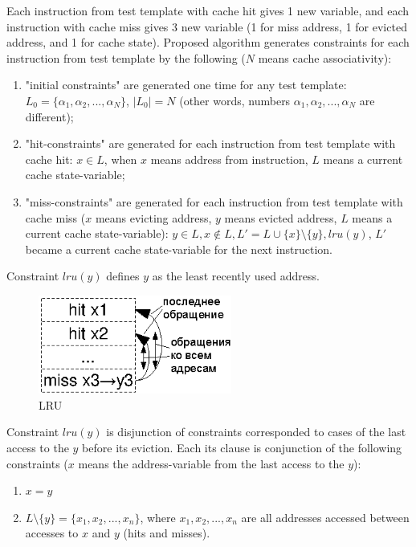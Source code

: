 Each instruction from test template with cache hit gives 1 new
variable, and each instruction with cache miss gives 3 new variable
(1 for miss address, 1 for evicted address, and 1 for cache state).
Proposed algorithm generates constraints for each instruction from
test template by the following ($N$ means cache associativity):
\begin{enumerate}
\item "initial constraints" are generated one time for any test template:
$L_0 = \{ \alpha_1, \alpha_2,..., \alpha_N\}$, $|L_0| = N$ (other
words, numbers $\alpha_1, \alpha_2,..., \alpha_N$ are different);
\item "hit-constraints" are generated for each instruction
from test template with cache hit: $x \in L$, when $x$ means address
from instruction, $L$ means a current cache state-variable;
\item "miss-constraints" are generated for each instruction
from test template with cache miss ($x$ means evicting address, $y$
means evicted address, $L$ means a current cache state-variable): $y
\in L, x \notin L, L' = L \cup \{x\} \setminus \{y\}, lru(y)$, $L'$
became a current cache state-variable for the next instruction.
\end{enumerate}

Constraint $lru(y)$ defines $y$ as the least recently used address.

\begin{figure}[h]
\centering
\includegraphics[width=2.5in]{lru}
\caption{LRU} \label{lru_picture}
\end{figure}

Constraint $lru(y)$ is disjunction of constraints corresponded to
cases of the last access to the $y$ before its eviction. Each its
clause is conjunction of the following constraints ($x$ means the
address-variable from the last access to the $y$):
\begin{enumerate}
\item $x = y$
\item $ L \setminus \{y\} = \{ x_1, x_2, ..., x_n \}$, where $x_1, x_2, ...,
x_n$ are all addresses accessed between accesses to $x$ and $y$
(hits and misses).
\end{enumerate}

